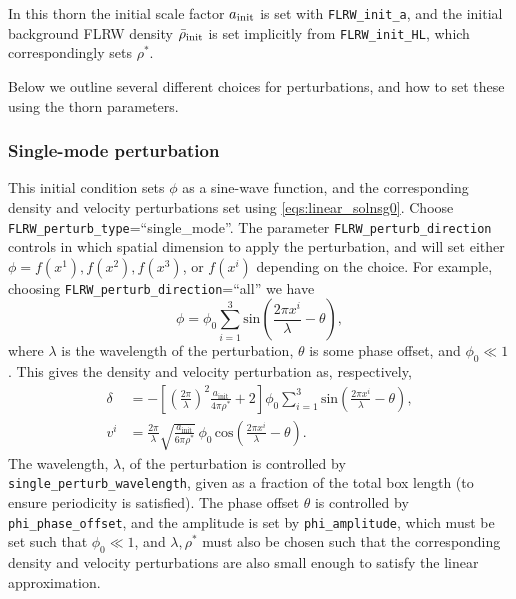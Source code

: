 In this thorn the initial scale factor $a_{\rm init}$ is set with \texttt{FLRW\_init\_a}, and the initial background FLRW density $\bar{\rho}_{\rm init}$ is set implicitly from \texttt{FLRW\_init\_HL}, which correspondingly sets $\rho^*$.

Below we outline several different choices for perturbations, and how to set these using the thorn parameters.

\subsubsection{Single-mode perturbation}

This initial condition sets $\phi$ as a sine-wave function, and the corresponding density and velocity perturbations set using \eqref{eqs:linear_solnsg0}. Choose \texttt{FLRW\_perturb\_type}=``single\_mode''. The parameter \texttt{FLRW\_perturb\_direction} controls in which spatial dimension to apply the perturbation, and will set either $\phi=f(x^1),f(x^2),f(x^3)$, or $f(x^i)$ depending on the choice. For example, choosing \texttt{FLRW\_perturb\_direction}=``all'' we have
\begin{equation}\label{eq:phi}
	\phi = \phi_{0} \sum_{i=1}^{3} \mathrm{sin}\left(\frac{2\pi x^{i}}{\lambda} - \theta \right),
\end{equation}
where $\lambda$ is the wavelength of the perturbation, $\theta$ is some phase offset, and $\phi_0\ll1$. This gives the density and velocity perturbation as, respectively, \cite{macpherson2017}
\begin{align} 
	\delta &= - \left[ \left(\frac{2\pi}{\lambda}\right)^{2} \frac{a_{\mathrm{init}}}{4\pi\rho^{*}} + 2\right] \phi_{0} \sum_{i=1}^{3} \mathrm{sin}\left(\frac{2\pi x^{i}}{\lambda} - \theta \right),\label{eq:initial_delta}\\
	v^{i} &= \frac{2\pi}{\lambda}\sqrt{\frac{a_{\mathrm{init}}}{6\pi\rho^{*}}}\, \phi_{0}\, \mathrm{cos}\left(\frac{2\pi x^{i}}{\lambda} - \theta \right). \label{eq:initial_deltav}
\end{align}
The wavelength, $\lambda$, of the perturbation is controlled by \texttt{single\_perturb\_wavelength}, given as a fraction of the total box length (to ensure periodicity is satisfied). The phase offset $\theta$ is controlled by {\tt phi\_phase\_offset}, and the amplitude is set by \texttt{phi\_amplitude}, which must be set such that $\phi_0\ll1$, and $\lambda, \rho^*$ must also be chosen such that the corresponding density and velocity perturbations are also small enough to satisfy the linear approximation. 

